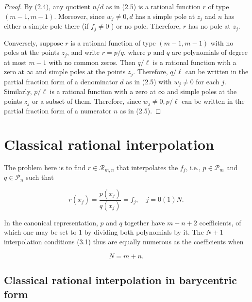 \documentclass[11pt]{article}
\theoremstyle{definition}
\begin{document}
    
    \begin{proof}
        By (2.4), any quotient $n / d$ as in (2.5) is a rational function $r$ of type $(m-1, m-1)$. Moreover, since $w_{j} \neq 0, d$ has a simple pole at $z_{j}$ and $n$ has either a simple pole there (if $f_{j} \neq 0$ ) or no pole. Therefore, $r$ has no pole at $z_{j}$.
        
        Conversely, suppose $r$ is a rational function of type $(m-1, m-1)$  with no poles at the points $z_{j}$, and write $r=p / q$, where $p$ and $q$ are polynomials of degree at most $m-1$ with no common zeros. Then $q / \ell$ is a rational function with a zero at $\infty$ and simple poles at the points $z_{j}$. Therefore, $q / \ell$ can be written in the partial fraction form of a denominator $d$ as in (2.5) with $w_{j} \neq 0$ for each $j$. Similarly, $p / \ell$ is a rational function with a zero at $\infty$ and simple poles at the points $z_{j}$ or a subset of them. Therefore, since $w_{j} \neq 0, p / \ell$ can be written in the partial fraction form of a numerator $n$ as in (2.5).
    \end{proof}
    

\section{Classical rational interpolation}

The problem here is to find $r \in \mathcal{R}_{m, n}$ that interpolates the $f_{j}$, i.e., $p \in \mathcal{P}_{m}$ and $q \in \mathcal{P}_{n}$ such that

\begin{equation*}
r\left(x_{j}\right)=\frac{p\left(x_{j}\right)}{q\left(x_{j}\right)}=f_{j}, \quad j=0(1) N . \tag{3.1}
\end{equation*}


In the canonical representation, $p$ and $q$ together have $m+n+2$ coefficients, of which one may be set to 1 by dividing both polynomials by it. The $N+1$ interpolation conditions (3.1) thus are equally numerous as the coefficients when

\begin{equation*}
N=m+n . \tag{3.2}
\end{equation*}



\subsection*{Classical rational interpolation in barycentric form}
\end{document}
